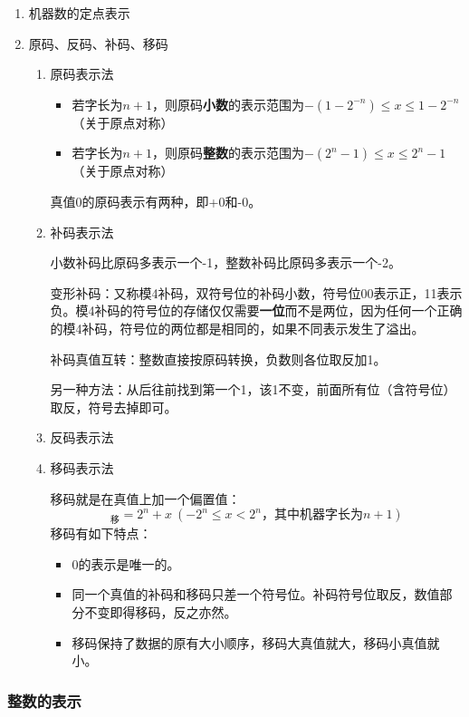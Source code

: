 \documentclass[12pt, a4paper, oneside]{ctexart}
\begin{document}
\begin{enumerate}
  \item 机器数的定点表示
  \item 原码、反码、补码、移码
  \begin{enumerate}
    \item 原码表示法
    
    \begin{itemize}
      \item 若字长为$n+1$，则原码\textbf{小数}的表示范围为$-(1-2^{-n})\leq x\leq 1-2^{-n}$（关于原点对称）
      \item 若字长为$n+1$，则原码\textbf{整数}的表示范围为$-(2^{n}-1)\leq x\leq 2^{n}-1$（关于原点对称）
    \end{itemize}

    真值0的原码表示有两种，即+0和-0。
    \item 补码表示法
    
    小数补码比原码多表示一个-1，整数补码比原码多表示一个-2。

    变形补码：又称模4补码，双符号位的补码小数，符号位00表示正，11表示负。模4补码的符号位的存储仅仅需要\textbf{一位}而不是两位，因为任何一个正确的模4补码，符号位的两位都是相同的，如果不同表示发生了溢出。

    补码真值互转：整数直接按原码转换，负数则各位取反加1。

    另一种方法：从后往前找到第一个1，该1不变，前面所有位（含符号位）取反，符号去掉即可。
    \item 反码表示法
    \item 移码表示法
    
    移码就是在真值上加一个偏置值：
    \begin{equation*}
      [x]_{\text{移}}=2^n+x\ (-2^n\leq x< 2^n\text{，其中机器字长为}n+1)
    \end{equation*}
    移码有如下特点：
    \begin{itemize}
      \item 0的表示是唯一的。
      \item 同一个真值的补码和移码只差一个符号位。补码符号位取反，数值部分不变即得移码，反之亦然。
      \item 移码保持了数据的原有大小顺序，移码大真值就大，移码小真值就小。
    \end{itemize}
  \end{enumerate}
\end{enumerate}

\subsubsection{整数的表示}
\end{document}
